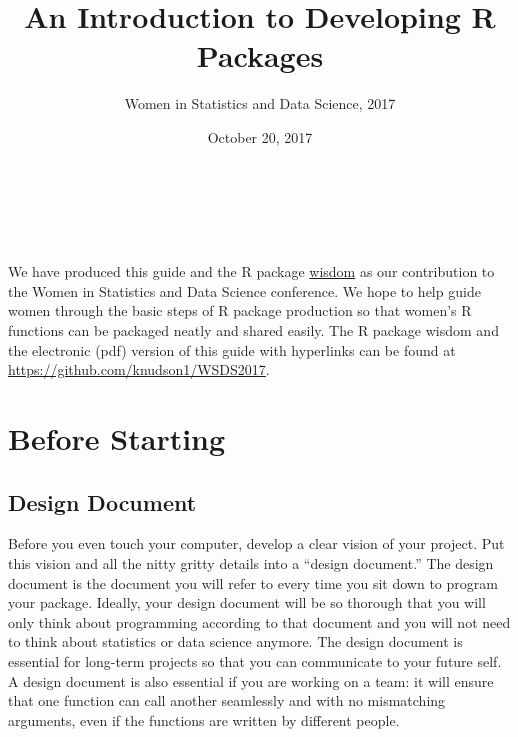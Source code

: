 \documentclass{article}
\title{An Introduction to Developing R Packages}
\author{Women in Statistics and Data Science, 2017}
\date{October 20, 2017}
\begin{document}
\maketitle{}

\\
 \\ \\ 



We have  produced this guide and the R package \href{https://github.com/knudson1/WSDS2017}{wisdom} as our contribution to the Women in Statistics and Data Science conference. We hope to help guide women through the basic steps of R package production so that  women's R functions can be packaged neatly and shared easily. The R package wisdom and the electronic (pdf) version of this guide with  hyperlinks can be found at \href{https://github.com/knudson1/WSDS2017}{\url{https://github.com/knudson1/WSDS2017}}. 


\section{Before Starting}




\subsection{Design Document}
Before you even touch your computer, develop a clear vision of your project. Put this vision and all the nitty gritty details  into a ``design document.'' The design document is the document you will refer to every time you sit down to program your package. Ideally,  your design document  will be so thorough that you will only think about programming according to that document and you will not need to think about statistics or data science anymore. The design document is essential for long-term projects so that you can communicate to your future self. A design document is also essential if you are working on a team: it will ensure that one function can call another seamlessly and with no mismatching arguments, even if the functions are written by different people.
\end{document}
